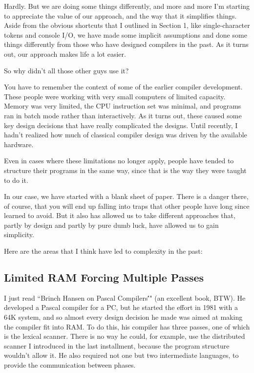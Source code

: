 Hardly. But we  are  doing some things differently, and more and more  I'm  starting  to appreciate the value of our approach, and the way that  it  simplifies  things. Aside  from  the obvious shortcuts that I outlined in Section 1, like single-character tokens and console I/O, we have  made some implicit assumptions and done some things differently from those who have designed compilers in the past. As it turns out, our approach makes life a lot easier.

So why didn't all those other guys use it?

You have to remember the context of some of the  earlier compiler development. These people were working with very small computers of  limited  capacity. Memory  was  very  limited, the  CPU instruction  set  was  minimal, and programs ran  in  batch  mode rather  than  interactively. As it turns out, these caused some key design decisions that have  really  complicated  the designs. Until recently, I hadn't realized how much of classical compiler design was driven by the available hardware.

Even in cases where these  limitations  no  longer  apply, people have  tended  to  structure their programs in the same way, since that is the way they were taught to do it.

In  our case, we have started with a blank sheet of paper. There is a danger there, of course, that  you will end up falling into traps that other people have long since learned to avoid. But it also has allowed us to  take different approaches that, partly by design  and partly by pure dumb luck, have  allowed  us  to  gain simplicity.

Here are the areas that I think have  led  to  complexity  in the past:

\subsection{Limited RAM Forcing Multiple Passes}

I  just  read  ``Brinch  Hansen  on  Pascal   Compilers\''"  (an excellent book, BTW). He  developed a Pascal compiler for a PC, but he started the effort in 1981 with a 64K system, and so almost every design decision  he made was aimed at making the compiler fit  into  RAM. To do this, his compiler has three passes, one of which is the lexical scanner. There is no way he could, for  example, use the distributed scanner I introduced  in  the last installment, because  the  program structure wouldn't allow it. He also required  not  one but two intermediate  languages, to  provide  the communication between phases.

